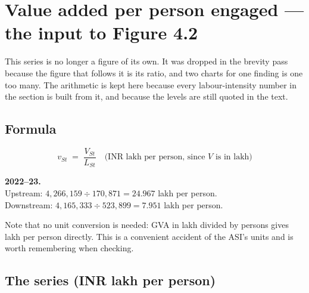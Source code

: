 \documentclass[11pt, a4paper]{article}
\begin{document}
\section{Value added per person engaged --- the input to Figure 4.2}

This series is no longer a figure of its own. It was dropped in the brevity pass
because the figure that follows it is its ratio, and two charts for one finding is
one too many. The arithmetic is kept here because every labour-intensity number in
the section is built from it, and because the levels are still quoted in the text.

\subsection{Formula}
\[
v_{St} \;=\; \frac{V_{St}}{L_{St}} \quad \text{(INR lakh per person, since $V$ is in lakh)}
\]

\begin{work}
\textbf{2022--23.} \\
Upstream: $4{,}266{,}159 \div 170{,}871 = 24.967$ lakh per person. \\
Downstream: $4{,}165{,}333 \div 523{,}899 = 7.951$ lakh per person.
\end{work}

\noindent Note that no unit conversion is needed: GVA in lakh divided by persons gives
lakh per person directly. This is a convenient accident of the ASI's units and is worth
remembering when checking.

\subsection{The series (INR lakh per person)}

\begin{table}[H]
\centering\footnotesize
{}
\end{table}
\end{document}
